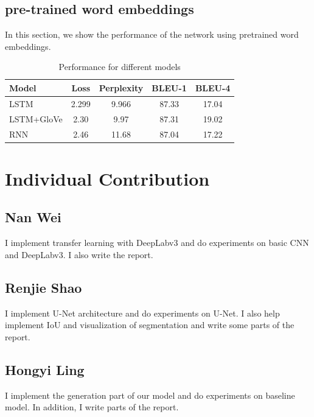 \documentclass{article} %
\begin{document}
\subsection{pre-trained word embeddings}
In this section, we show the performance of the network using pretrained word embeddings.


\begin{table}[!htb]
    \centering
    \begin{tabular}{l|c|c|c|c}
        \hline
        Model & Loss & Perplexity & BLEU-1 & BLEU-4 \\
        \hline
        LSTM & 2.299 & 9.966 & 87.33 & 17.04 \\
        \hline
        LSTM+GloVe& 2.30 & 9.97 &87.31&19.02\\\hline
        RNN & 2.46 & 11.68 & 87.04 & 17.22 \\
	    \hline
    \end{tabular}
    \caption{Performance for different models}
    \label{acc}
\end{table}

\section{Individual Contribution}

\subsection*{Nan Wei}
I implement transfer learning with DeepLabv3 and do experiments on basic CNN and DeepLabv3. I also write the report.

\subsection*{Renjie Shao}
I implement U-Net architecture and do experiments on U-Net. I also help implement IoU and visualization of segmentation and write some parts of the report.
\subsection*{Hongyi Ling}
I implement the generation part of our model and do experiments on baseline model.  In addition, I write parts of the report.



\end{document}
